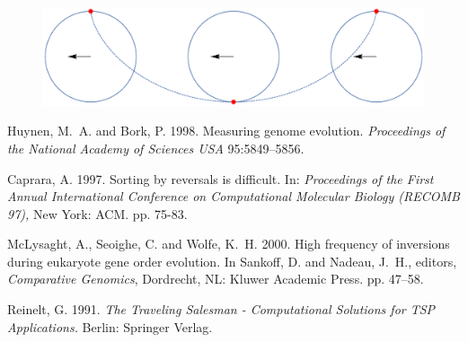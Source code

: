 \documentclass{article}
\begin{document}
\begin{figure}[h!]
	\centering
	\includegraphics[scale=0.35, angle=180]{cycloid.eps}
\end{figure}







\footnotesize
 \begin{thebibliography}{99}

 Huynen, M.~A. and Bork, P. 1998. Measuring genome evolution. {\em
Proceedings of the National Academy of Sciences USA}
  95:5849--5856.

 Caprara, A. 1997. Sorting by reversals is difficult. In: {\em
Proceedings of the First Annual International Conference on Computational
Molecular Biology (RECOMB 97),} New York: ACM.  pp. 75-83.

McLysaght, A., Seoighe, C. and Wolfe, K.~H. 2000. High frequency
of inversions during eukaryote gene order evolution.     In Sankoff, D. and
Nadeau, J.~H., editors, {\em Comparative Genomics},  Dordrecht, NL: Kluwer
Academic Press. pp. 47--58.

 Reinelt, G. 1991. {\em The Traveling Salesman - Computational
Solutions for TSP Applications.} Berlin: Springer Verlag.

\end{thebibliography}



%
\end{document}
